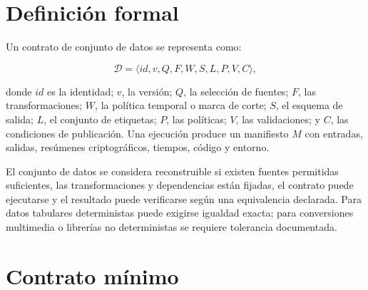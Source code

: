 \section{Definición formal}

Un contrato de conjunto de datos se representa como:

\begin{equation}
\mathcal{D}=\langle id,v,Q,F,W,S,L,P,V,C\rangle,
\end{equation}

donde $id$ es la identidad; $v$, la versión; $Q$, la selección de fuentes; $F$, las
transformaciones; $W$, la política temporal o marca de corte; $S$, el esquema de salida;
$L$, el conjunto de etiquetas; $P$, las políticas; $V$, las validaciones; y $C$, las
condiciones de publicación. Una ejecución produce un manifiesto $M$ con entradas,
salidas, resúmenes criptográficos, tiempos, código y entorno.

El conjunto de datos se considera reconstruible si existen fuentes permitidas suficientes, las
transformaciones y dependencias están fijadas, el contrato puede ejecutarse y el
resultado puede verificarse según una equivalencia declarada. Para datos tabulares
deterministas puede exigirse igualdad exacta; para conversiones multimedia o librerías
no deterministas se requiere tolerancia documentada.

\section{Contrato mínimo}

